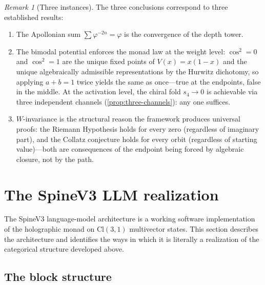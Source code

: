 \documentclass[11pt,a4paper]{article}
\theoremstyle{plain}
\theoremstyle{definition}
\theoremstyle{remark}
\newtheorem{remark}[theorem]{Remark}
\numberwithin{equation}{section}
\providecommand{\Cl}{\mathrm{Cl}}
\providecommand{\vp}{\varphi}
\begin{document}
\begin{remark}[Three instances]
\label{rmk:three-instances}
The three conclusions correspond to three established results:
\begin{enumerate}[label=(\arabic*),nosep]
  \item The Apollonian sum $\sum \vp^{-2n} = \vp$ is the
    convergence of the depth tower.
  \item The bimodal potential enforces the monad law at the
    weight level: $\cos^2 = 0$ and $\cos^2 = 1$ are the unique
    fixed points of $V(x) = x(1-x)$ and the unique
    algebraically admissible representations by the Hurwitz
    dichotomy, so applying $a + b = 1$ twice yields the same as
    once---true at the endpoints, false in the middle.  At the
    activation level, the chiral fold $s_4 \to 0$ is achievable
    via three independent channels
    (\cref{prop:three-channels}): any one suffices.
  \item $W$-invariance is the structural reason the
    framework produces universal proofs: the Riemann Hypothesis
    holds for every zero (regardless of imaginary part), and
    the Collatz conjecture holds for every orbit (regardless of
    starting value)---both are consequences of the endpoint
    being forced by algebraic closure, not by the path.
\end{enumerate}
\end{remark}


\section{The SpineV3 LLM realization}
\label{sec:spine-v3}

The SpineV3 language-model architecture
\cite{spine-v3} is a working software implementation of the
holographic monad on $\Cl(3,1)$ multivector states.  This section
describes the architecture and identifies the ways in which it is
literally a realization of the categorical structure developed
above.

\subsection{The block structure}
\end{document}

